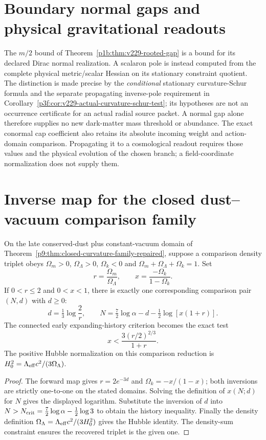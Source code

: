 \documentclass[12pt,a4paper]{article}
\begin{document}
\printbibliography
\section{Boundary normal gaps and physical gravitational readouts}
\label{p6b:sec:v229-normal-readout}
The $m/2$ bound of Theorem~\ref{p1b:thm:v229-rooted-gap} is a bound
for its declared Dirac normal realization. A scalaron pole is instead
computed from the complete physical metric/scalar Hessian on its
stationary constraint quotient. The distinction is made precise by the \emph{conditional} stationary
curvature-Schur formula and the separate propagating inverse-pole requirement
in Corollary~\ref{p3f:cor:v229-actual-curvature-schur-test}; its hypotheses
are not an occurrence certificate for an actual radial source packet.
A normal gap alone
therefore supplies no new dark-matter mass threshold or abundance.
The exact conormal cap coefficient also retains its absolute incoming
weight and action-domain comparison. Propagating it to a cosmological
readout requires those values and the physical evolution of the chosen
branch; a field-coordinate normalization does not supply them.


\section{Inverse map for the closed dust--vacuum comparison family}
\label{p9:sec:v356-closed-comparison-inverse}

\begin{theorem}
\label{p9:thm:v356-closed-comparison-inverse}
On the late conserved-dust plus constant-vacuum domain of
Theorem~\ref{p9:thm:closed-curvature-family-repaired}, suppose a
comparison density triplet obeys
$\Omega_m>0$, $\Omega_\Lambda>0$, $\Omega_k<0$ and
$\Omega_m+\Omega_\Lambda+\Omega_k=1$.  Set
\[
 r=\frac{\Omega_m}{\Omega_\Lambda},\qquad
 x=\frac{-\Omega_k}{1-\Omega_k}.
\]
If $0<r\le2$ and $0<x<1$, there is exactly one corresponding
comparison pair $(N,d)$ with $d\ge0$:
\[
 \boxed{d=\tfrac13\log\frac2r,\qquad
 N=\tfrac72\log\alpha-d-\tfrac12\log[x(1+r)].}
\]
The connected early expanding-history criterion becomes the
exact test
\[
 \boxed{x<\frac{3(r/2)^{2/3}}{1+r}.}
\]
The positive Hubble normalization on this comparison reduction is
$H_0^2=\Lambda_{\rm eff}c^2/(3\Omega_\Lambda)$.
\end{theorem}
\begin{proof}
The forward map gives $r=2e^{-3d}$ and
$\Omega_k=-x/(1-x)$; both inversions are strictly one-to-one on
the stated domains.  Solving the definition of $x(N;d)$ for $N$
gives the displayed logarithm.  Substitute the inversion of $d$
into $N>N_{\rm crit}=\tfrac72\log\alpha-\tfrac12\log3$
to obtain the history inequality.  Finally the density definition
$\Omega_\Lambda=\Lambda_{\rm eff}c^2/(3H_0^2)$ gives the Hubble
identity.  The density-sum constraint ensures the recovered triplet
is the given one.
\end{proof}
\end{document}
